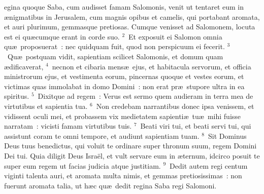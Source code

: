 \bchapter
{}egina quoque Saba, cum audisset famam Salomonis, venit ut tentaret eum in \ae nigmatibus in Jerusalem, cum magnis opibus et camelis, qui portabant aromata, et auri plurimum, gemmasque pretiosas. Cumque venisset ad Salomonem, locuta est ei qu\ae cumque erant in corde suo.
${}^{2}$~Et exposuit ei Salomon omnia qu\ae\ proposuerat~: nec quidquam fuit, quod non perspicuum ei fecerit.
${}^{3}$~Qu\ae\ postquam vidit, sapientiam scilicet Salomonis, et domum quam \ae dificaverat,
${}^{4}$~necnon et cibaria mens\ae\ ejus, et habitacula servorum, et officia ministrorum ejus, et vestimenta eorum, pincernas quoque et vestes eorum, et victimas quas immolabat in domo Domini~: non erat pr\ae\ stupore ultra in ea spiritus.
${}^{5}$~Dixitque ad regem~: Verus est sermo quem audieram in terra mea de virtutibus et sapientia tua.
${}^{6}$~Non credebam narrantibus donec ipsa venissem, et vidissent oculi mei, et probassem vix medietatem sapienti\ae\ tu\ae\ mihi fuisse narratam~: vicisti famam virtutibus tuis.
${}^{7}$~Beati viri tui, et beati servi tui, qui assistunt coram te omni tempore, et audiunt sapientiam tuam.
${}^{8}$~Sit Dominus Deus tuus benedictus, qui voluit te ordinare super thronum suum, regem Domini Dei tui. Quia diligit Deus Isra\"el, et vult servare eum in \ae ternum, idcirco posuit te super eum regem ut facias judicia atque justitiam.
${}^{9}$~Dedit autem regi centum viginti talenta auri, et aromata multa nimis, et gemmas pretiosissimas~: non fuerunt aromata talia, ut h\ae c qu\ae\ dedit regina Saba regi Salomoni.


